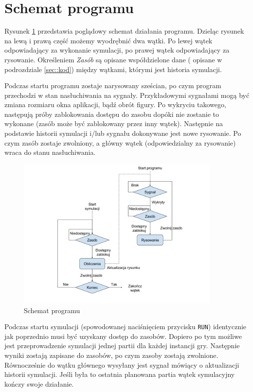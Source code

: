 
\section{Schemat programu}
\label{sec::schemat}
Rysunek \ref{fig:schemat} przedstawia poglądowy schemat działania programu\cite{Tut}. Dzieląc rysunek na lewą i prawą część możemy wyodrębnić dwa wątki. Po lewej wątek odpowiadający za wykonanie symulacji, po prawej wątek odpowiadający za rysowanie. Określeniem \textit{Zasób} są opisane współdzielone dane ( opisane w podrozdziale \ref{sec::kod}) między wątkami, którymi jest historia symulacji. 

Podczas startu programu zostaje narysowany sześcian, po czym program przechodzi w stan nasłuchiwania na sygnały. Przykładowymi sygnałami mogą być zmiana rozmiaru okna aplikacji, bądź obrót figury. Po wykryciu takowego, następują próby zablokowania dostępu do zasobu dopóki nie zostanie to wykonane (zasób może być zablokowany przez inny wątek). Następnie na podstawie historii symulacji i/lub sygnału dokonywane jest nowe rysowanie. Po czym zasób zostaje zwolniony, a główny wątek (odpowiedzialny za rysowanie) wraca do stanu nasłuchiwania. 
\begin{figure}
    \centering
    \includegraphics[width=0.9\textwidth]{pict/schemat.png}   
    \caption{Schemat programu}
	\label{fig:schemat} 
\end{figure}
Podczas startu symulacji (spowodowanej naciśnięciem przycisku \texttt{RUN}) identycznie jak poprzednio musi być uzyskany dostęp do zasobów. Dopiero po tym możliwe jest przeprowadzenie symulacji jednej partii dla każdej instancji gry. Następnie wyniki zostają zapisane do zasobów, po czym zasoby zostają zwolnione. Równocześnie do wątku głównego wysyłany jest sygnał mówiący o aktualizacji historii symulacji. Jeśli była to ostatnia planowana partia wątek symulacyjny kończy swoje działanie.

